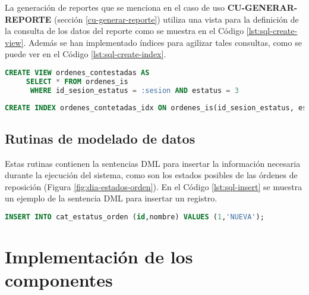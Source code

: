 La generación de reportes que se menciona en el caso de uso \textbf{CU-GENERAR-REPORTE} (sección \ref{cu-generar-reporte}) utiliza una vista para la definición de la consulta de los datos del reporte como se muestra en el Código \ref{lst:sql-create-view}. Además se han implementado índices para agilizar tales consultas, como se puede ver en el Código \ref{lst:sql-create-index}.

\begin{lstlisting}[language=SQL, caption={Sentencia para crear una vista.}, captionpos=b, label={lst:sql-create-view}]
CREATE VIEW ordenes_contestadas AS
     SELECT * FROM ordenes_is
      WHERE id_sesion_estatus = :sesion AND estatus = 3
\end{lstlisting}

\begin{lstlisting}[language=SQL, caption={Sentencia para crear un índice.}, captionpos=b, label={lst:sql-create-index}]
CREATE INDEX ordenes_contetadas_idx ON ordenes_is(id_sesion_estatus, estatus);
\end{lstlisting}

\subsection{Rutinas de modelado de datos}
Estas rutinas contienen la sentencias DML para insertar la información necesaria durante la ejecución del sistema, como son los estados posibles de las órdenes de reposición (Figura \ref{fig:dia-estados-orden}). En el Código \ref{lst:sql-insert} se muestra un ejemplo de la sentencia DML para insertar un registro.

\begin{lstlisting}[language=SQL, caption={Sentencia insertar un registro.}, captionpos=b, label={lst:sql-insert}]
INSERT INTO cat_estatus_orden (id,nombre) VALUES (1,'NUEVA');
\end{lstlisting}

%

\section{Implementación de los componentes}\label{sec:comp-impl}







